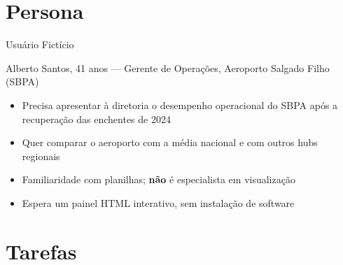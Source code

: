 \documentclass[aspectratio=169]{beamer}
\begin{document}
\section{Persona}

\begin{frame}[t]{Usuário Fictício}
  \begin{block}{Alberto Santos, 41 anos --- Gerente de Operações, Aeroporto Salgado Filho (SBPA)}
    \begin{itemize}\setlength{\itemsep}{7pt}
      \item Precisa apresentar à diretoria o \alert{desempenho operacional do SBPA}
            após a recuperação das enchentes de 2024
      \item Quer comparar o aeroporto com a média nacional e com outros hubs regionais
      \item Familiaridade com planilhas; \textbf{não} é especialista em visualização
      \item Espera um painel HTML interativo, sem instalação de software
    \end{itemize}
  \end{block}
\end{frame}

\section{Tarefas}
\end{document}
